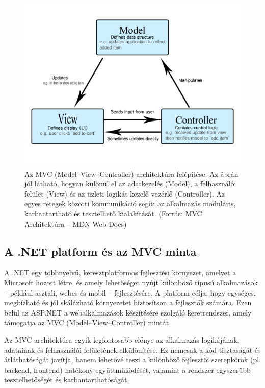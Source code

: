 \begin{figure}[H]
    \centering
    \includegraphics[width=1\textwidth]{Szakdolgozat/Mellekletek/model-view-controller-light-blue.png}
    \caption{Az MVC (Model–View–Controller) architektúra felépítése. Az ábrán jól látható, hogyan különül el az adatkezelés (Model), a felhasználói felület (View) és az üzleti logikát kezelő vezérlő (Controller). Az egyes rétegek közötti kommunikáció segíti az alkalmazás moduláris, karbantartható és tesztelhető kialakítását. (Forrás: MVC Architektúra – MDN Web Docs)}
    \label{fig:er-diagram}
\end{figure}


\subsection{A .NET platform és az MVC minta}

\indent A .NET egy többnyelvű, keresztplatformos fejlesztési környezet, amelyet a Microsoft hozott létre, és amely lehetőséget nyújt különböző típusú alkalmazások – például asztali, webes és mobil – fejlesztésére. A platform célja, hogy egységes, megbízható és jól skálázható környezetet biztosítson a fejlesztők számára. Ezen belül az ASP.NET a webalkalmazások készítésére szolgáló keretrendszer, amely támogatja az MVC (Model–View–Controller) mintát.

Az MVC architektúra egyik legfontosabb előnye az alkalmazás logikájának, adatainak és felhasználói felületének elkülönítése. Ez nemcsak a kód tisztaságát és átláthatóságát javítja, hanem lehetővé teszi a különböző fejlesztői szerepkörök (pl. backend, frontend) hatékony együttműködését, valamint a rendszer egyszerűbb tesztelhetőségét és karbantarthatóságát.

